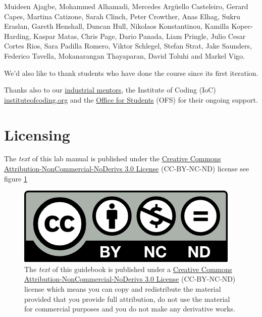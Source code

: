 \documentclass[
]{book}
\begin{document}
Muideen Ajagbe, Mohammed Alhamadi, Mercedes Argüello Casteleiro, Gerard Capes, Martina Catizone, Sarah Clinch, Peter Crowther, Anas Elhag, Sukru Eraslan, Gareth Henshall, Duncan Hull, Nikolaos Konstantinou, Kamilla Kopec-Harding, Kaspar Matas, Chris Page, Dario Panada, Liam Pringle, Julio Cesar Cortes Rios, Sara Padilla Romero, Viktor Schlegel, Stefan Strat, Jake Saunders, Federico Tavella, Mokanarangan Thayaparan, David Toluhi and Markel Vigo.

We'd also like to thank students who have done the course since its first iteration.

Thanks also to our \href{https://www.cs.manchester.ac.uk/connect/business-engagement/industrial-mentoring/}{industrial mentors}, the Institute of Coding (IoC) \href{https://instituteofcoding.org/}{instituteofcoding.org} and the \href{https://www.officeforstudents.org.uk/}{Office for Students} (OFS) for their ongoing support.

\hypertarget{license}{%
\section{Licensing}\label{license}}

The \emph{text} of this lab manual is published under the \href{https://creativecommons.org/licenses/by-nc-nd/3.0/}{Creative Commons Attribution-NonCommercial-NoDerivs 3.0 License} (CC-BY-NC-ND) license see figure \ref{fig:cc-by-nc-nd-fig}

\begin{figure}

{\centering \includegraphics[width=1\linewidth]{images/by-nc-nd} 

}

\caption{The \emph{text} of this guidebook is published under a \href{https://creativecommons.org/licenses/by-nc-nd/3.0/}{Creative Commons Attribution-NonCommercial-NoDerivs 3.0 License} (CC-BY-NC-ND) license which means you can copy and redistribute the material provided that you provide full attribution, do not use the material for commercial purposes and you do not make any derivative works.}\label{fig:cc-by-nc-nd-fig}
\end{figure}
\end{document}

